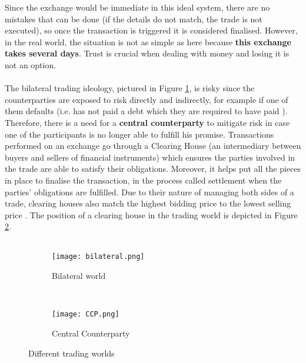 \documentclass[12pt,twoside]{article}
\begin{document}
Since the exchange would be immediate in this ideal system, there are no mistakes that can be done (if the details do not match, the trade is not executed), so once the transaction is triggered it is considered finalised. However, in the real world, the situation is not as simple as here because \textbf{this exchange takes several days}. Trust is crucial when dealing with money and losing it is not an option. 
\\ \\
The bilateral trading ideology, pictured in Figure \ref{fig:bilTrading}, is risky since the counterparties are exposed to risk directly and indirectly, for example if one of them defaults (i.e. has not paid a debt which they are required to have paid \cite{default}). Therefore, there is a need for a \textbf{central counterparty} to mitigate risk in case one of the participants is no longer able to fulfill his promise. Transactions performed on an exchange go through a Clearing House (an intermediary between buyers and sellers of financial instruments) which ensures the parties involved in the trade are able to satisfy their obligations.  Moreover, it helps put all the pieces in place to finalise the transaction, in the process called settlement when the parties' obligations are fulfilled. Due to their nature of managing both sides of a trade, clearing houses also match the highest bidding price to the lowest selling price \cite{exchsettle}. The position of a clearing house in the trading world is depicted in Figure \ref{fig:CCP}. \\ \\
\begin{figure}[H]
    \centering
    \begin{subfigure}[b]{0.48\textwidth}
        \texttt{[image: bilateral.png]}
        \caption{Bilateral world}
        \label{fig:bilTrading}
    \end{subfigure}
    ~
    \begin{subfigure}[b]{0.48\textwidth}
        \texttt{[image: CCP.png]}
        \caption{Central Counterparty}
        \label{fig:CCP}
    \end{subfigure}
    \caption{Different trading worlds}
    \label{fig:TW}
\end{figure}
\end{document}
